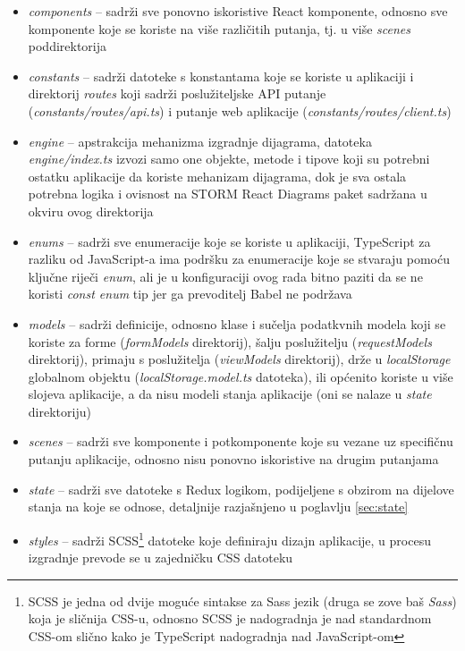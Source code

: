 \documentclass[times, utf8, diplomski, numeric]{fer}
\begin{document}
\begin{itemize}
    \item \emph{components} -- sadrži sve ponovno iskoristive React komponente, odnosno sve komponente koje se koriste na više različitih putanja, tj. u više \emph{scenes} poddirektorija
    \item \emph{constants} -- sadrži datoteke s konstantama koje se koriste u aplikaciji i direktorij \emph{routes} koji sadrži poslužiteljske API putanje (\emph{constants/routes/api.ts}) i putanje web aplikacije (\emph{constants/routes/client.ts})
    \item \emph{engine} -- apstrakcija mehanizma izgradnje dijagrama, datoteka \emph{engine/index.ts} izvozi samo one objekte, metode i tipove koji su potrebni ostatku aplikacije da koriste mehanizam dijagrama, dok je sva ostala potrebna logika i ovisnost na STORM React Diagrams paket sadržana u okviru ovog direktorija
    \item \emph{enums} -- sadrži sve enumeracije koje se koriste u aplikaciji, TypeScript za razliku od JavaScript-a ima podršku za enumeracije koje se stvaraju pomoću ključne riječi \emph{enum}, ali je u konfiguraciji ovog rada bitno paziti da se ne koristi \emph{const enum} tip jer ga prevoditelj Babel ne podržava
    \item \emph{models} -- sadrži definicije, odnosno klase i sučelja podatkvnih modela koji se koriste za forme (\emph{formModels} direktorij), šalju poslužitelju (\emph{requestModels} direktorij), primaju s poslužitelja (\emph{viewModels} direktorij), drže u \emph{localStorage} globalnom objektu (\emph{localStorage.model.ts} datoteka), ili općenito koriste u više slojeva aplikacije, a da nisu modeli stanja aplikacije (oni se nalaze u \emph{state} direktoriju)
    \item \emph{scenes} -- sadrži sve komponente i potkomponente koje su vezane uz specifičnu putanju aplikacije, odnosno nisu ponovno iskoristive na drugim putanjama
    \item \emph{state} -- sadrži sve datoteke s Redux logikom, podijeljene s obzirom na dijelove stanja na koje se odnose, detaljnije razjašnjeno u poglavlju \ref{sec:state}
    \item \emph{styles} -- sadrži SCSS\footnote{
        SCSS je jedna od dvije moguće sintakse za Sass jezik (druga se zove baš \emph{Sass}) koja je sličnija CSS-u, odnosno SCSS je nadogradnja  je nad standardnom CSS-om slično kako je TypeScript nadogradnja nad JavaScript-om
    } datoteke koje definiraju dizajn aplikacije, u procesu izgradnje prevode se u zajedničku CSS datoteku

\end{itemize}
\end{document}
